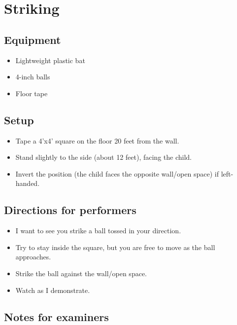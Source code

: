 \documentclass[
  letterpaper,
  DIV=11,
  numbers=noendperiod]{scrreprt}
\providecommand{\tightlist}{%
  \setlength{\itemsep}{0pt}\setlength{\parskip}{0pt}}
\begin{document}
\section{Striking}\label{striking}

\subsection{Equipment}\label{equipment-5}

\begin{itemize}
\tightlist
\item
  Lightweight plastic bat
\item
  4-inch balls
\item
  Floor tape
\end{itemize}

\subsection{Setup}\label{setup-4}

\begin{itemize}
\tightlist
\item
  Tape a 4'x4' square on the floor 20 feet from the wall.
\item
  Stand slightly to the side (about 12 feet), facing the child.
\item
  Invert the position (the child faces the opposite wall/open space) if
  left-handed.
\end{itemize}

\subsection{Directions for
performers}\label{directions-for-performers-4}

\begin{itemize}
\tightlist
\item
  I want to see you strike a ball tossed in your direction.
\item
  Try to stay inside the square, but you are free to move as the ball
  approaches.
\item
  Strike the ball against the wall/open space.
\item
  Watch as I demonstrate.
\end{itemize}

\subsection{Notes for examiners}\label{notes-for-examiners-4}
\end{document}
